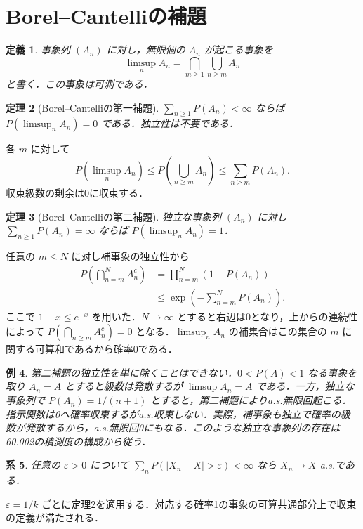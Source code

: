 \documentclass[a5paper,10pt,onecolumn]{jsarticle}
\makeatletter
\theoremstyle{mathnotetheorem}
\newtheorem{theorem}{定理}[section]
\newtheorem{definition}[theorem]{定義}
\newtheorem{corollary}[theorem]{系}
\newtheorem{example}[theorem]{例}
\renewcommand{\proofname}{証明}
\renewenvironment{proof}[1][\proofname]{%
  \par\pushQED{\qed}\normalfont\topsep4\p@\@plus2\p@\relax
  \trivlist\item[\hskip\labelsep\bfseries #1]\ignorespaces
}{\popQED\endtrivlist\@endpefalse}
\newcommand{\1}{\mathbf{1}}
\makeatother
\begin{document}
\section{Borel--Cantelliの補題}
\begin{definition}
事象列 $(A_n)$ に対し，無限個の $A_n$ が起こる事象を
\[
 \limsup_n A_n=\bigcap_{m\ge1}\bigcup_{n\ge m}A_n
\]
と書く．この事象は可測である．
\end{definition}
\begin{theorem}[Borel--Cantelliの第一補題]\label{bc1}
$\sum_{n\ge1}P(A_n)<\infty$ ならば $P(\limsup_n A_n)=0$ である．独立性は不要である．
\end{theorem}
\begin{proof}
各 $m$ に対して
\[
 P(\limsup_n A_n)\le P\left(\bigcup_{n\ge m}A_n\right)
 \le\sum_{n\ge m}P(A_n).
\]
収束級数の剰余は0に収束する．
\end{proof}
\begin{theorem}[Borel--Cantelliの第二補題]\label{bc2}
独立な事象列 $(A_n)$ に対し $\sum_{n\ge1}P(A_n)=\infty$ ならば $P(\limsup_n A_n)=1$．
\end{theorem}
\begin{proof}
任意の $m\le N$ に対し補事象の独立性から
\begin{align*}
 P\left(\bigcap_{n=m}^N A_n^c\right)
 &=\prod_{n=m}^N(1-P(A_n))\\
 &\le\exp\left(-\sum_{n=m}^N P(A_n)\right).
\end{align*}
ここで $1-x\le e^{-x}$ を用いた．$N\to\infty$ とすると右辺は0となり，上からの連続性によって $P(\bigcap_{n\ge m}A_n^c)=0$ となる．$\limsup_nA_n$ の補集合はこの集合の $m$ に関する可算和であるから確率0である．
\end{proof}
\begin{example}
第二補題の独立性を単に除くことはできない．$0<P(A)<1$ なる事象を取り $A_n=A$ とすると級数は発散するが $\limsup A_n=A$ である．一方，独立な事象列で $P(A_n)=1/(n+1)$ とすると，第二補題によりa.s.無限回起こる．指示関数は0へ確率収束するがa.s.収束しない．実際，補事象も独立で確率の級数が発散するから，a.s.無限回0にもなる．このような独立な事象列の存在は60.002の積測度の構成から従う．
\end{example}
\begin{corollary}\label{completeconv}
任意の $\varepsilon>0$ について $\sum_nP(|X_n-X|>\varepsilon)<\infty$ なら $X_n\to X$ a.s.である．
\end{corollary}
\begin{proof}
$\varepsilon=1/k$ ごとに定理\ref{bc1}を適用する．対応する確率1の事象の可算共通部分上で収束の定義が満たされる．
\end{proof}
\end{document}
